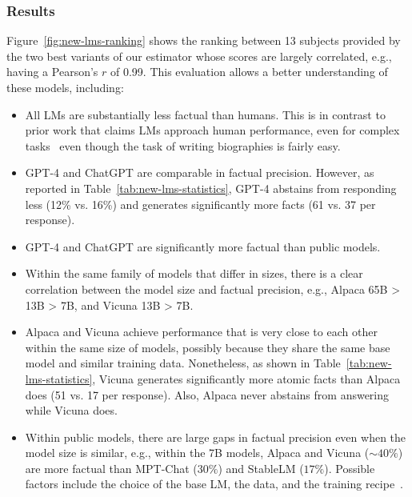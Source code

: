 \documentclass[11pt]{article}
\newcommand{\kalpesh}[1]{\textcolor{brown}{[Kalpesh: #1]}
}
\begin{document}
\subsubsection{Results}
Figure~\ref{fig:new-lms-ranking} shows the ranking between 13 subjects provided by the two best variants of our estimator whose scores are largely correlated, e.g., having a Pearson's $r$ of 0.99.
This evaluation allows a better understanding of these models, including:\vspace{-.3em}
\begin{itemize}[leftmargin=12pt]\itemsep -.2em
    \item All LMs are substantially less factual than humans. This is in contrast to prior work that claims LMs approach human performance, even for complex tasks~\citep{ding2022gpt,nori2023capabilities,lee2023benefits} even though the task of writing  biographies is fairly easy.
    \item GPT-4 and ChatGPT are comparable in factual precision. However, as reported in Table~\ref{tab:new-lms-statistics}, GPT-4 abstains from responding less (12\% vs. 16\%) and generates significantly more facts (61 vs. 37 per response).
    \item GPT-4 and ChatGPT are significantly more factual than public models.
    \item Within the same family of models that differ in sizes, there is a clear correlation between the model size and factual precision, e.g., Alpaca 65B > 13B > 7B, and Vicuna 13B > 7B.
    \item Alpaca and Vicuna achieve performance that is very close to each other within the same size of models, possibly because they share the same base model and similar training data.
    Nonetheless, as shown in Table~\ref{tab:new-lms-statistics}, 
    Vicuna generates significantly more atomic facts than Alpaca does (51 vs. 17 per response). Also, Alpaca never abstains from answering while Vicuna does. %
    \item Within public models, there are large gaps in factual precision even when the model size is similar, e.g., within the 7B models, Alpaca and Vicuna ($\sim40\%$) are more factual than MPT-Chat ($30\%$) and StableLM ($17\%$).
    Possible factors include the choice of the base LM, the data, and the training recipe~\citep{hoffmann2022training}. %
\end{itemize}
\end{document}
